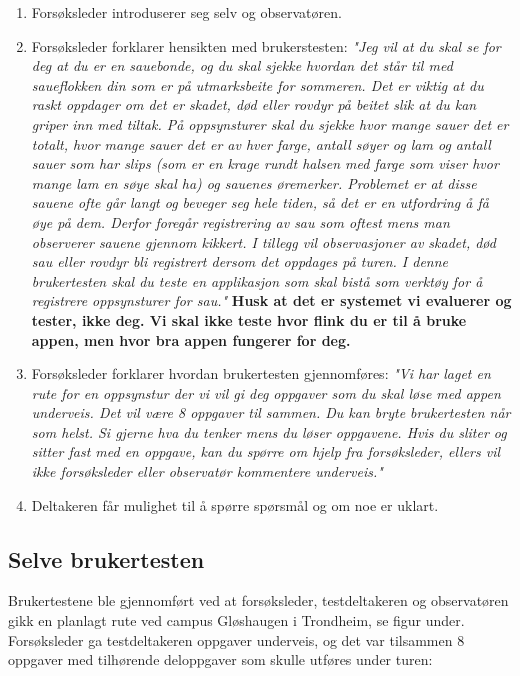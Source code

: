 \begin{enumerate}
    \item Forsøksleder introduserer seg selv og observatøren.
    \item Forsøksleder forklarer hensikten med brukerstesten: 
    \newline
    \textit{"Jeg vil at du skal se for deg at du er en sauebonde, og du skal sjekke hvordan det står til med saueflokken din som er på utmarksbeite for sommeren. Det er viktig at du raskt oppdager om det er skadet, død eller rovdyr på beitet slik at du kan griper inn med tiltak.
    På oppsynsturer skal du sjekke hvor mange sauer det er totalt, hvor mange sauer det er av hver farge, antall søyer og lam og antall sauer som har slips (som er en krage rundt halsen med farge som viser hvor mange lam en søye skal ha) og sauenes øremerker. Problemet er at disse sauene ofte går langt og beveger seg hele tiden, så det er en utfordring å få øye på dem. Derfor foregår registrering av sau som oftest mens man observerer sauene gjennom kikkert. I tillegg vil observasjoner av skadet, død sau eller rovdyr bli registrert dersom det oppdages på turen. I denne brukertesten skal du teste en applikasjon som skal bistå som verktøy for å registrere oppsynsturer for sau."}
    \newline
    \newline
    \textbf{Husk at det er systemet vi evaluerer og tester, ikke deg. Vi skal ikke teste hvor flink du er til å bruke appen, men hvor bra appen fungerer for deg.}
    \item Forsøksleder forklarer hvordan brukertesten gjennomføres:
    \newline
    \textit{"Vi har laget en rute for en oppsynstur der vi vil gi deg oppgaver som du skal løse med appen underveis. Det vil være 8 oppgaver til sammen.  Du kan bryte brukertesten når som helst. Si gjerne hva du tenker mens du løser oppgavene. Hvis du sliter og sitter fast med en oppgave, kan du spørre om hjelp fra forsøksleder, ellers vil ikke forsøksleder eller observatør kommentere underveis."}
    \item Deltakeren får mulighet til å spørre spørsmål og om noe er uklart.
\end{enumerate}

\subsection{Selve brukertesten} \label{brukertest}
Brukertestene ble gjennomført ved at forsøksleder, testdeltakeren og observatøren gikk en planlagt rute ved campus Gløshaugen i Trondheim, se figur  under. Forsøksleder ga testdeltakeren oppgaver underveis, og det var tilsammen 8 oppgaver med tilhørende deloppgaver som skulle utføres under turen:

